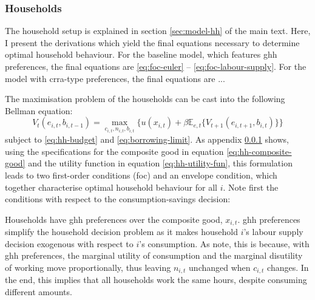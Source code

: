 \documentclass[a4paper,12pt]{article} %
\numberwithin{equation}{section} %
\numberwithin{figure}{section}
\numberwithin{table}{section}
\begin{document}
\begin{refsection}
\begin{appendices}
\subsubsection{Households}
\label{sec-app:full-derivations-households}

The household setup is explained in section \ref{sec:model-hh} of the main text. Here, I present the derivations which yield the final equations necessary to determine optimal household behaviour. For the baseline model, which features \Gls{ghh} preferences, the final equations are \eqref{eq:foc-euler} -- \eqref{eq:foc-labour-supply}. For the model with \Gls{crra}-type preferences, the final equations are ...

The maximisation problem of the households can be cast into the following Bellman equation:
\begin{equation}
    V_t (e_{i,t}, b_{i,t-1}) = \max_{c_{i,t}, n_{i,t}, b_{i,t}} \Bigg\{ u(x_{i,t}) + \beta \mathbb{E}_{e,t} \{ V_{t+1} (e_{i,t+1}, b_{i,t}) \} \Bigg\} \label{eq:app-hh-bellman}
\end{equation}
subject to \eqref{eq:hh-budget} and \eqref{eq:borrowing-limit}. As appendix \ref{sec-app:full-derivations-households} shows, using the specifications for the composite good in equation \eqref{eq:hh-composite-good} and the utility function in equation \eqref{eq:hh-utility-fun}, this formulation leads to two first-order conditions (\Gls{foc}) and an envelope condition, which together characterise optimal household behaviour for all $i$. Note first the conditions with respect to the consumption-savings decision:

Households have \Gls{ghh} preferences over the composite good, $x_{i,t}$. \Gls{ghh} preferences simplify the household decision problem as it makes household $i$'s labour supply decision exogenous with respect to $i$'s consumption. As \textcite{auclert2017} note, this is because, with \Gls{ghh} preferences, the marginal utility of consumption and the marginal disutility of working move proportionally, thus leaving $n_{i,t}$ unchanged when $c_{i,t}$ changes. In the end, this implies that all households work the same hours, despite consuming different amounts.


\end{appendices}
\end{refsection}
\end{document}
